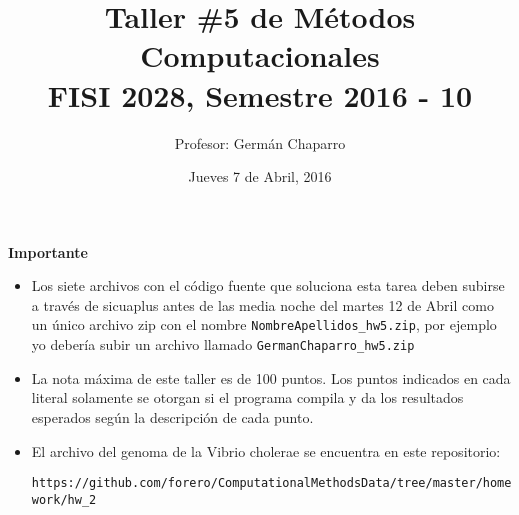 \documentclass{article}
\title{Taller \#5 de M\'etodos Computacionales\\ FISI 2028, Semestre 2016 - 10}
\author{Profesor: Germán Chaparro}
\date{Jueves 7 de Abril, 2016}
\begin{document}
\maketitle
\thispagestyle{empty}


{\bf Importante}
\begin{itemize}

\item Los siete archivos con el c\'odigo fuente que soluciona esta
  tarea deben subirse a trav\'es de sicuaplus antes de las media noche del
  martes 12 de Abril como un \'unico archivo zip con el nombre
  \verb"NombreApellidos_hw5.zip", por ejemplo yo deber\'ia subir un
  archivo llamado \verb"GermanChaparro_hw5.zip"

\item La nota m\'axima de este taller es de 100 puntos. Los puntos indicados
en cada literal solamente se otorgan si el programa compila y da los
resultados esperados seg\'un la descripci\'on de cada punto.
 

\item El archivo del genoma de la Vibrio cholerae se encuentra en este
  repositorio:

  \verb"https://github.com/forero/ComputationalMethodsData/tree/master/homework/hw_2"
\end{itemize}
\end{document}
